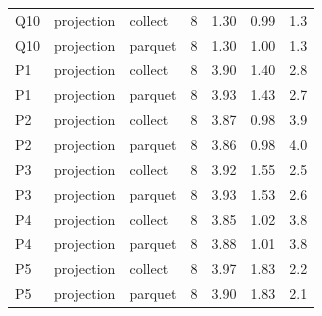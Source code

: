 \begin{tabular}{lllrrrr}
Q10 & projection & collect & 8 & 1.30 & 0.99 & 1.3 \\
Q10 & projection & parquet & 8 & 1.30 & 1.00 & 1.3 \\
P1 & projection & collect & 8 & 3.90 & 1.40 & 2.8 \\
P1 & projection & parquet & 8 & 3.93 & 1.43 & 2.7 \\
P2 & projection & collect & 8 & 3.87 & 0.98 & 3.9 \\
P2 & projection & parquet & 8 & 3.86 & 0.98 & 4.0 \\
P3 & projection & collect & 8 & 3.92 & 1.55 & 2.5 \\
P3 & projection & parquet & 8 & 3.93 & 1.53 & 2.6 \\
P4 & projection & collect & 8 & 3.85 & 1.02 & 3.8 \\
P4 & projection & parquet & 8 & 3.88 & 1.01 & 3.8 \\
P5 & projection & collect & 8 & 3.97 & 1.83 & 2.2 \\
P5 & projection & parquet & 8 & 3.90 & 1.83 & 2.1 \\
\bottomrule
\end{tabular}
